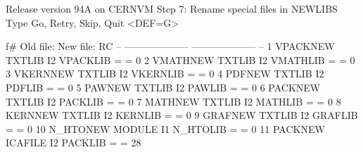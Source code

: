 \begin{XMPt}{Release version 94A on CERNVM}
 Step 7: Rename special files in NEWLIBS
 Type Go, Retry, Skip, Quit <DEF=G>
 
 
 
 f# Old file:              New file:            RC
 -- --------------------   -------------------- --
 1  VPACKNEW TXTLIB   I2   VPACKLIB =        =  0
 2  VMATHNEW TXTLIB   I2   VMATHLIB =        =  0
 3  VKERNNEW TXTLIB   I2   VKERNLIB =        =  0
 4  PDFNEW   TXTLIB   I2   PDFLIB   =        =  0
 5  PAWNEW   TXTLIB   I2   PAWLIB   =        =  0
 6  PACKNEW  TXTLIB   I2   PACKLIB  =        =  0
 7  MATHNEW  TXTLIB   I2   MATHLIB  =        =  0
 8  KERNNEW  TXTLIB   I2   KERNLIB  =        =  0
 9  GRAFNEW  TXTLIB   I2   GRAFLIB  =        =  0
 10 N_HTONEW MODULE   I1   N_HTOLIB =        =  0
 11 PACKNEW  ICAFILE  I2   PACKLIB  =        =  28
 
 
 

\end{XMPt}
